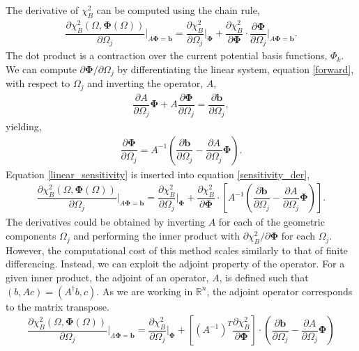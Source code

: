 \documentclass[aps,unsortedaddress]{revtex4-1}
\newcommand{\partder}[2]{\dfrac{\partial  #1}{\partial  #2}}
\begin{document}
The derivative of $\chi^2_B$ can be computed using the chain rule, 
\begin{gather}
\partder{\chi^2_B(\Omega, \bm{\Phi}(\Omega))}{\Omega_j} \bigg \rvert_{A \bm{\Phi} = \bm{b}} = \partder{\chi^2_B}{\Omega_j} \bigg \rvert_{\bm{\Phi}} + \partder{\chi^2_B}{\bm{\Phi}} \cdot \partder{\bm{\Phi}}{\Omega_j} \bigg \rvert_{A \bm{\Phi} = \bm{b}}.
\label{sensitivity_der}
\end{gather}
The dot product is a contraction over the current potential basis functions, $\Phi_k$. We can compute $\partial \bm{\Phi}/ \partial \Omega_j$ by differentiating the linear system, equation \ref{forward}, with respect to $\Omega_j$ and inverting the operator, $A$,
\begin{gather}
\partder{A}{\Omega_j} \bm{\Phi} + A \partder{\bm{\Phi}}{\Omega_j} = \partder{\bm{b}}{\Omega_j},
\end{gather}
yielding,
\begin{gather}
\partder{\bm{\Phi}}{\Omega_j} = A^{-1} \left( \partder{\bm{b}}{\Omega_j} - \partder{A}{\Omega_j} \bm{\Phi} \right).
\label{linear_sensitivity}
\end{gather}
Equation \ref{linear_sensitivity} is inserted into equation \ref{sensitivity_der},
\begin{gather}
\partder{\chi^2_B(\Omega, \bm{\Phi}(\Omega))}{\Omega_j} \bigg \rvert_{A \bm{\Phi} = \bm{b}} = \partder{\chi^2_B}{\Omega_j} \bigg \rvert_{\bm{\Phi}} + \partder{\chi^2_B}{\bm{\Phi}} \cdot \left[ A^{-1} \left( \partder{\bm{b}}{\Omega_j} - \partder{A}{\Omega_j} \bm{\Phi} \right) \right].
\end{gather}
The derivatives could be obtained by inverting $A$ for each of the geometric components $\Omega_j$ and performing the inner product with $\partial \chi^2_B/ \partial \bm{\Phi}$ for each $\Omega_j$. However, the computational cost of this method scales similarly to that of finite differencing. Instead, we can exploit the adjoint property of the operator. For a given inner product, the adjoint of an operator, $A$, is defined such that $(b,Ac) = (A^{\dagger} b, c)$. As we are working in $\mathbb{R}^n$, the adjoint operator corresponds to the matrix transpose. 
\begin{gather}
\partder{\chi^2_B(\Omega, \bm{\Phi}(\Omega))}{\Omega_j} \bigg \rvert_{A \bm{\Phi} = \bm{b}} = \partder{\chi^2_B}{\Omega_j} \bigg \rvert_{\bm{\Phi}} + \left[ \left(A^{-1}\right)^{T} \partder{\chi^2_B}{\bm{\Phi}}\right] \cdot \left( \partder{\bm{b}}{\Omega_j} - \partder{A}{\Omega_j} \bm{\Phi} \right)
\end{gather}
\end{document}
